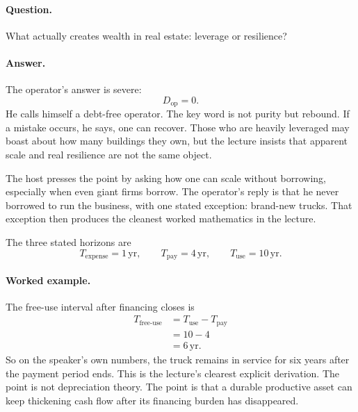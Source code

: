 \paragraph{Question.} What actually creates wealth in real estate: leverage or resilience?

\paragraph{Answer.} The operator's answer is severe:
\begin{equation}
D_{\text{op}}=0.
\end{equation}
He calls himself a debt-free operator. The key word is not purity but rebound. If a mistake occurs, he says, one can recover. Those who are heavily leveraged may boast about how many buildings they own, but the lecture insists that apparent scale and real resilience are not the same object.

The host presses the point by asking how one can scale without borrowing, especially when even giant firms borrow. The operator's reply is that he never borrowed to run the business, with one stated exception: brand-new trucks. That exception then produces the cleanest worked mathematics in the lecture.

The three stated horizons are
\begin{equation}
T_{\text{expense}}=1\,\mathrm{yr},\qquad
T_{\text{pay}}=4\,\mathrm{yr},\qquad
T_{\text{use}}=10\,\mathrm{yr}.
\end{equation}

\begin{figure}
\centering
{}
\end{figure}

\paragraph{Worked example.}
The free-use interval after financing closes is
\begin{align}
T_{\text{free-use}}
&=T_{\text{use}}-T_{\text{pay}}\\
&=10-4\\
&=6\,\mathrm{yr}.
\end{align}
So on the speaker's own numbers, the truck remains in service for six years after the payment period ends. This is the lecture's clearest explicit derivation. The point is not depreciation theory. The point is that a durable productive asset can keep thickening cash flow after its financing burden has disappeared.

